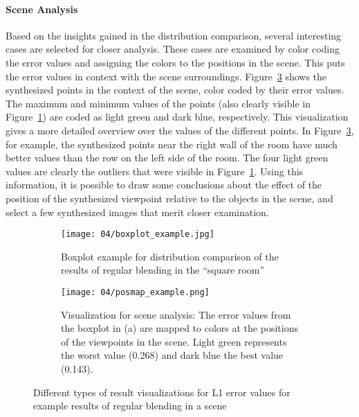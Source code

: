 \paragraph{Scene Analysis}
Based on the insights gained in the distribution comparison, several interesting cases are selected for closer analysis. These cases are examined by color coding the error values and assigning the colors to the positions in the scene. This puts the error values in context with the scene surroundings. Figure~\ref{fig:posmap_example} shows the synthesized points in the context of the scene, color coded by their error values. The maximum and minimum values of the points (also clearly visible in Figure~\ref{fig:boxplot_example}) are coded as light green and dark blue, respectively. This visualization gives a more detailed overview over the values of the different points. In Figure~\ref{fig:posmap_example}, for example, the synthesized points near the right wall of the room have much better values than the row on the left side of the room. The four light green values are clearly the outliers that were visible in Figure~\ref{fig:boxplot_example}. Using this information, it is possible to draw some conclusions about the effect of the position of the synthesized viewpoint relative to the objects in the scene, and select a few synthesized images that merit closer examination.

\begin{figure}
\centering
    \hfill
    \begin{subfigure}[c]{0.5\textwidth}
            \centering
            \texttt{[image: 04/boxplot\_example.jpg]}
            \caption{Boxplot example for distribution comparison of the results of regular blending in the ``square room''} \label{fig:boxplot_example}
    \end{subfigure}%
    \hfill
    \begin{subfigure}[c]{0.5\textwidth}
            \centering
            \texttt{[image: 04/posmap\_example.png]}
            \caption{Visualization for scene analysis: The error values from the boxplot in (a) are mapped to colors at the positions of the viewpoints in the scene. Light green represents the worst value (0.268) and dark blue the best value (0.143).} \label{fig:posmap_example}
    \end{subfigure}
    \hfill
  \caption[Different types of result visualizations for L1 error values]{Different types of result visualizations for L1 error values for example results of regular blending in a scene}
\end{figure}

